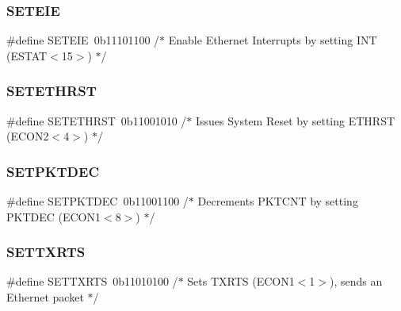 \subsubsection{\texorpdfstring{SETEIE}{SETEIE}}
{\footnotesize\ttfamily \#define S\+E\+T\+E\+IE~0b11101100 /$\ast$ Enable Ethernet Interrupts by setting I\+N\+T (\+E\+S\+T\+A\+T$<$15$>$) $\ast$/}

\mbox{\label{group___single_ga8763648ea939c9f6494cca43828dcc0c}} 
\subsubsection{\texorpdfstring{SETETHRST}{SETETHRST}}
{\footnotesize\ttfamily \#define S\+E\+T\+E\+T\+H\+R\+ST~0b11001010 /$\ast$ Issues System Reset by setting E\+T\+H\+R\+S\+T (\+E\+C\+O\+N2$<$4$>$) $\ast$/}

\mbox{\label{group___single_gab4cdb8940073f2025cab184a4215510f}} 
\subsubsection{\texorpdfstring{SETPKTDEC}{SETPKTDEC}}
{\footnotesize\ttfamily \#define S\+E\+T\+P\+K\+T\+D\+EC~0b11001100 /$\ast$ Decrements P\+K\+T\+C\+N\+T by setting P\+K\+T\+D\+E\+C (\+E\+C\+O\+N1$<$8$>$) $\ast$/}

\mbox{\label{group___single_ga889d3bef89093b4c5a113384ed539052}} 
\subsubsection{\texorpdfstring{SETTXRTS}{SETTXRTS}}
{\footnotesize\ttfamily \#define S\+E\+T\+T\+X\+R\+TS~0b11010100 /$\ast$ Sets T\+X\+R\+T\+S (\+E\+C\+O\+N1$<$1$>$), sends an Ethernet packet $\ast$/}

